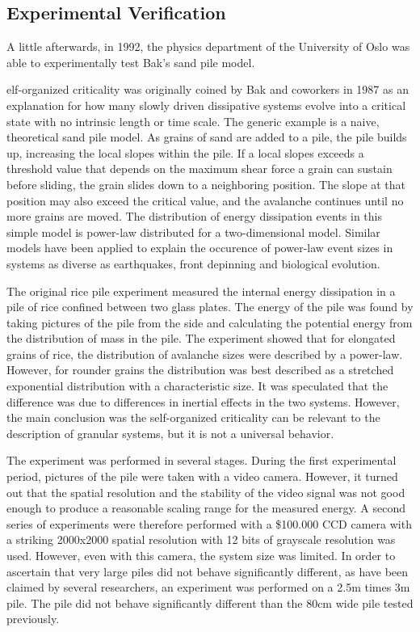 \documentclass{book}
\begin{document}
\subsection{Experimental Verification}
A little afterwards, in 1992, the physics department of the University of Oslo was able to experimentally test Bak's sand pile model. 

elf-organized criticality was originally coined by Bak and coworkers in 1987 as an explanation for how many slowly driven dissipative systems evolve into a critical state with no intrinsic length or time scale. The generic example is a naive, theoretical sand pile model. As grains of sand are added to a pile, the pile builds up, increasing the local slopes within the pile. If a local slopes exceeds a threshold value that depends on the maximum shear force a grain can sustain before sliding, the grain slides down to a neighboring position. The slope at that position may also exceed the critical value, and the avalanche continues until no more grains are moved. The distribution of energy dissipation events in this simple model is power-law distributed for a two-dimensional model. Similar models have been applied to explain the occurence of power-law event sizes in systems as diverse as earthquakes, front depinning and biological evolution.

The original rice pile experiment measured the internal energy dissipation in a pile of rice confined between two glass plates. The energy of the pile was found by taking pictures of the pile from the side and calculating the potential energy from the distribution of mass in the pile. The experiment showed that for elongated grains of rice, the distribution of avalanche sizes were described by a power-law. However, for rounder grains the distribution was best described as a stretched exponential distribution with a characteristic size. It was speculated that the difference was due to differences in inertial effects in the two systems. However, the main conclusion was the self-organized criticality can be relevant to the description of granular systems, but it is not a universal behavior.

The experiment was performed in several stages. During the first experimental period, pictures of the pile were taken with a video camera. However, it turned out that the spatial resolution and the stability of the video signal was not good enough to produce a reasonable scaling range for the measured energy. A second series of experiments were therefore performed with a \$100.000 CCD camera with a striking 2000x2000 spatial resolution with 12 bits of grayscale resolution was used. However, even with this camera, the system size was limited. In order to ascertain that very large piles did not behave significantly different, as have been claimed by several researchers, an experiment was performed on a 2.5m times 3m pile. The pile did not behave significantly different than the 80cm wide pile tested previously.
\end{document}
